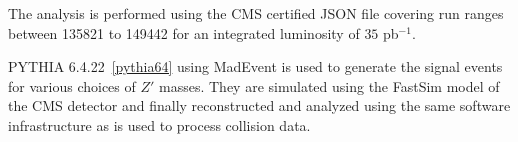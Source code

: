The analysis is performed using the CMS certified JSON file covering run ranges
between 135821 to 149442 for an integrated luminosity of $35$ pb$^{-1}$. 

PYTHIA 6.4.22~\ref{pythia64} using MadEvent is used to generate the signal events for various choices of
$Z'$ masses. They are simulated using the FastSim model of the CMS detector and finally reconstructed 
and analyzed using the same software infrastructure as is used to process collision data.
